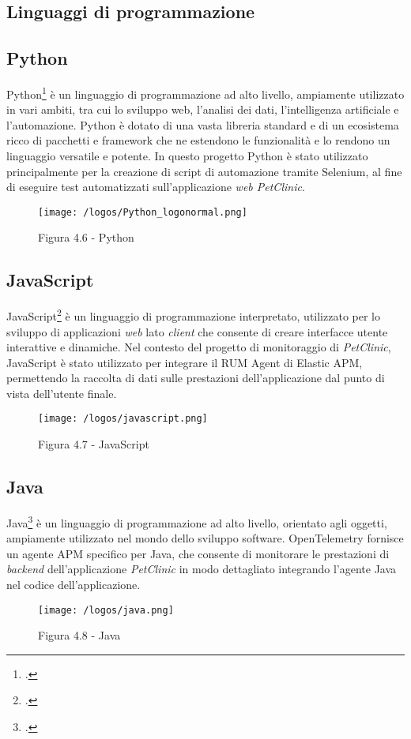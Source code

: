 \newpage
\subsection{Linguaggi di programmazione}
\subsection*{Python}
Python\footcite{site:python} è un linguaggio di programmazione ad alto livello, ampiamente utilizzato in vari ambiti, tra cui lo sviluppo web, l'analisi dei dati, l'intelligenza artificiale e l'automazione. Python è dotato di una vasta libreria standard e di un ecosistema ricco di pacchetti e framework che ne estendono le funzionalità e lo rendono un linguaggio versatile e potente. In questo progetto Python è stato utilizzato principalmente per la creazione di script di automazione tramite Selenium, al fine di eseguire test automatizzati sull'applicazione \emph{web PetClinic}.
\begin{figure}[H] 
    \centering 
    \texttt{[image: /logos/Python\_logonormal.png]} 
    \caption{Figura 4.6 - Python}
\end{figure}

\vspace{1em}

\subsection*{JavaScript}
JavaScript\footcite{site:javascript} è un linguaggio di programmazione interpretato, utilizzato per lo sviluppo di applicazioni \emph{web} lato \emph{client} che consente di creare interfacce utente interattive e dinamiche. Nel contesto del progetto di monitoraggio di \emph{PetClinic}, JavaScript è stato utilizzato per integrare il RUM Agent di Elastic APM, permettendo la raccolta di dati sulle prestazioni dell'applicazione dal punto di vista dell'utente finale.
\begin{figure}[H] 
    \centering 
    \texttt{[image: /logos/javascript.png]} 
    \caption{Figura 4.7 - JavaScript}
\end{figure}

\vspace{1em}

\subsection*{Java}
Java\footcite{site:java} è un linguaggio di programmazione ad alto livello, orientato agli oggetti, ampiamente utilizzato nel mondo dello sviluppo software. OpenTelemetry fornisce un agente APM specifico per Java, che consente di monitorare le prestazioni di \emph{backend} dell'applicazione \emph{PetClinic} in modo dettagliato integrando l'agente Java nel codice dell'applicazione.
\begin{figure}[H] 
    \centering 
    \texttt{[image: /logos/java.png]} 
    \caption{Figura 4.8 - Java}
\end{figure}


